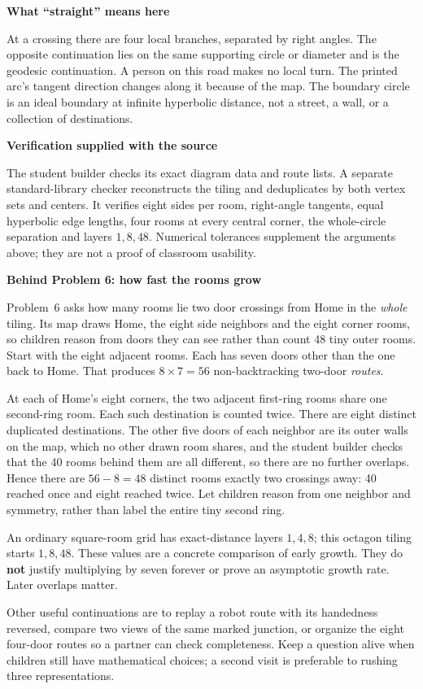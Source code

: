 \documentclass[11pt]{article}
\newcommand{\topic}[1]{\vspace{4pt}{\large\bfseries #1}\par}
\newcommand{\sub}[1]{{\bfseries #1}\par}
\begin{document}
\sub{What ``straight'' means here}
At a crossing there are four local branches, separated by right angles. The opposite continuation lies on the same supporting circle or diameter and is the geodesic continuation. A person on this road makes no local turn. The printed arc's tangent direction changes along it because of the map. The boundary circle is an ideal boundary at infinite hyperbolic distance, not a street, a wall, or a collection of destinations.

\sub{Verification supplied with the source}
The student builder checks its exact diagram data and route lists. A separate standard-library checker reconstructs the tiling and deduplicates by both vertex sets and centers. It verifies eight sides per room, right-angle tangents, equal hyperbolic edge lengths, four rooms at every central corner, the whole-circle separation and layers \(1,8,48\). Numerical tolerances supplement the arguments above; they are not a proof of classroom usability.
\newpage

\topic{A return visit, and what to keep from it}
\sub{Behind Problem 6: how fast the rooms grow}\label{growth}
Problem~6 asks how many rooms lie two door crossings from Home in the \emph{whole} tiling. Its map draws Home, the eight side neighbors and the eight corner rooms, so children reason from doors they can see rather than count 48 tiny outer rooms. Start with the eight adjacent rooms. Each has seven doors other than the one back to Home. That produces \(8\times7=56\) non-backtracking two-door \emph{routes}.

At each of Home's eight corners, the two adjacent first-ring rooms share one second-ring room. Each such destination is counted twice. There are eight distinct duplicated destinations. The other five doors of each neighbor are its outer walls on the map, which no other drawn room shares, and the student builder checks that the 40 rooms behind them are all different, so there are no further overlaps. Hence there are \(56-8=48\) distinct rooms exactly two crossings away: 40 reached once and eight reached twice. Let children reason from one neighbor and symmetry, rather than label the entire tiny second ring.

An ordinary square-room grid has exact-distance layers \(1,4,8\); this octagon tiling starts \(1,8,48\). These values are a concrete comparison of early growth. They do \textbf{not} justify multiplying by seven forever or prove an asymptotic growth rate. Later overlaps matter.

Other useful continuations are to replay a robot route with its handedness reversed, compare two views of the same marked junction, or organize the eight four-door routes so a partner can check completeness. Keep a question alive when children still have mathematical choices; a second visit is preferable to rushing three representations.
\end{document}
